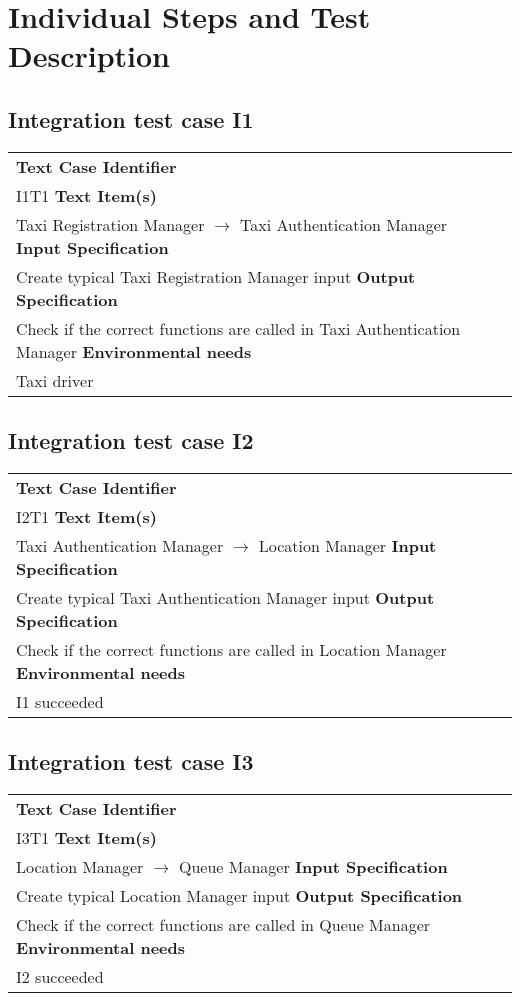 \section{Individual Steps and Test Description}
\subsection{Integration test case I1}
	\begin{tabular} {ll}
		\hline \textbf{Text Case Identifier} & \\ I1T1
		\hline \textbf{Text Item(s)} & \\ Taxi Registration Manager $\rightarrow$ Taxi Authentication Manager
		\hline \textbf{Input Specification} & \\ Create typical Taxi Registration Manager input
		\hline \textbf{Output Specification} & \\ Check if the correct functions are called in Taxi Authentication Manager
		\hline \textbf{Environmental needs} & \\ Taxi driver
		\hline 
	\end{tabular}
\subsection{Integration test case I2}
	\begin{tabular} {ll}
		\hline \textbf{Text Case Identifier} & \\ I2T1
		\hline \textbf{Text Item(s)} & \\ Taxi Authentication Manager $\rightarrow$ Location Manager
		\hline \textbf{Input Specification} & \\ Create typical Taxi Authentication Manager input
		\hline \textbf{Output Specification} & \\ Check if the correct functions are called in Location Manager
		\hline \textbf{Environmental needs} & \\ I1 succeeded
		\hline 
	\end{tabular}
\subsection{Integration test case I3}
	\begin{tabular} {ll}
		\hline \textbf{Text Case Identifier} & \\ I3T1
		\hline \textbf{Text Item(s)} & \\ Location Manager $\rightarrow$ Queue Manager
		\hline \textbf{Input Specification} & \\ Create typical Location Manager input
		\hline \textbf{Output Specification} & \\ Check if the correct functions are called in Queue Manager
		\hline \textbf{Environmental needs} & \\ I2 succeeded
		\hline 
	\end{tabular}
